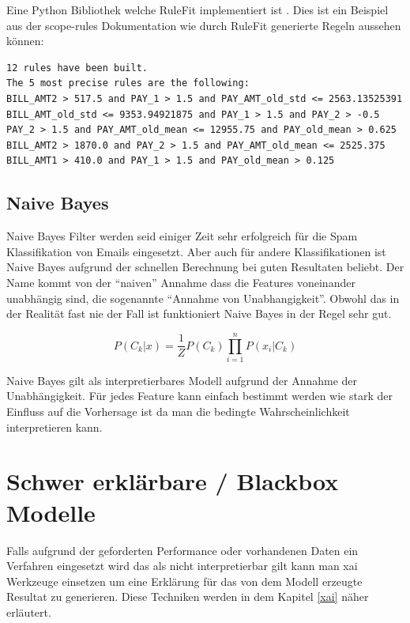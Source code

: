 \documentclass[
  12pt, %
  a4paper, %
  oneside, %
  openany, 
  numbers=noenddot, %
  BCOR=5mm, %
  parskip=half*, %
  thesis, %
]{bfhbook}
\begin{document}
Eine Python Bibliothek welche RuleFit implementiert ist \parencite{scopeRules}. Dies ist ein Beispiel aus der scope-rules Dokumentation wie durch RuleFit generierte Regeln aussehen können:
\begin{minipage}[t]{\linewidth}
\begin{lstlisting}
12 rules have been built.
The 5 most precise rules are the following:
BILL_AMT2 > 517.5 and PAY_1 > 1.5 and PAY_AMT_old_std <= 2563.13525391
BILL_AMT_old_std <= 9353.94921875 and PAY_1 > 1.5 and PAY_2 > -0.5
PAY_2 > 1.5 and PAY_AMT_old_mean <= 12955.75 and PAY_old_mean > 0.625
BILL_AMT2 > 1870.0 and PAY_2 > 1.5 and PAY_AMT_old_mean <= 2525.375
BILL_AMT1 > 410.0 and PAY_1 > 1.5 and PAY_old_mean > 0.125
\end{lstlisting}
\end{minipage}

\subsection{Naive Bayes}
\label{nb}
Naive Bayes Filter werden seid einiger Zeit sehr erfolgreich für die Spam Klassifikation von Emails eingesetzt. Aber auch für andere Klassifikationen ist Naive Bayes aufgrund der schnellen Berechnung bei guten Resultaten beliebt. Der Name kommt von der ``naiven'' Annahme dass die Features voneinander unabhängig sind, die sogenannte  ``Annahme von Unabhangigkeit''. Obwohl das in der Realität fast nie der Fall ist funktioniert Naive Bayes in der Regel sehr gut.

\[ P(C_k|x) = \frac{1}{Z}P(C_k) \prod_{i=1}^{n}  P(x_i|C_k) \]

Naive Bayes gilt als interpretierbares Modell aufgrund der Annahme der Unabhängigkeit. Für jedes Feature kann einfach bestimmt werden wie stark der Einfluss auf die Vorhersage ist da man die bedingte Wahrscheinlichkeit interpretieren kann.

\section{Schwer erklärbare / Blackbox Modelle}
Falls aufgrund der geforderten Performance oder vorhandenen Daten ein Verfahren eingesetzt wird das als nicht interpretierbar gilt kann man \Gls{xai} Werkzeuge einsetzen um eine Erklärung für das von dem Modell erzeugte Resultat zu generieren. Diese Techniken werden in dem Kapitel \ref{xai} näher erläutert.
\end{document}
